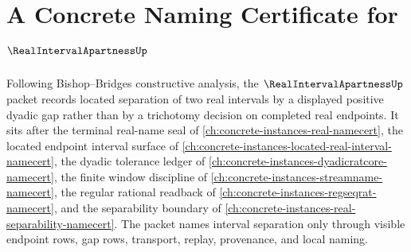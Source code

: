 \chapter{A Concrete Naming Certificate for $\RealIntervalApartnessUp$}
\label{ch:concrete-instances-real-interval-apartness-namecert}

Following Bishop--Bridges constructive analysis, the $\RealIntervalApartnessUp$ packet records located separation of two real intervals by a displayed positive dyadic gap rather than by a trichotomy decision on completed real endpoints. It sits after the terminal real-name seal of \autoref{ch:concrete-instances-real-namecert}, the located endpoint interval surface of \autoref{ch:concrete-instances-located-real-interval-namecert}, the dyadic tolerance ledger of \autoref{ch:concrete-instances-dyadicratcore-namecert}, the finite window discipline of \autoref{ch:concrete-instances-streamname-namecert}, the regular rational readback of \autoref{ch:concrete-instances-regseqrat-namecert}, and the separability boundary of \autoref{ch:concrete-instances-real-separability-namecert}. The packet names interval separation only through visible endpoint rows, gap rows, transport, replay, provenance, and local naming.

